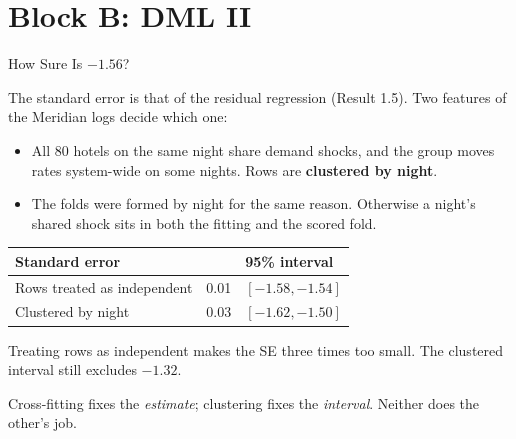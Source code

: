 \documentclass[aspectratio=169, 11pt, handout]{beamer}
\begin{document}
\section{Block B: DML II}

\begin{frame}{How Sure Is $-1.56$?}

The standard error is that of the residual regression (Result 1.5). Two features of the Meridian logs decide which one:
\begin{itemize}
  \item All 80 hotels on the same night share demand shocks, and the group moves rates system-wide on some nights. Rows are \textbf{clustered by night}.
  \item The folds were formed by night for the same reason. Otherwise a night's shared shock sits in both the fitting and the scored fold.
\end{itemize}

\begin{center}
\small
\begin{tabular}{lrl}
\toprule
\textbf{Standard error} & & \textbf{95\% interval} \\
\midrule
Rows treated as independent & 0.01 & $[-1.58, -1.54]$ \\
Clustered by night & 0.03 & $[-1.62, -1.50]$ \\
\bottomrule
\end{tabular}
\end{center}

\medskip

Treating rows as independent makes the SE three times too small. The clustered interval still excludes $-1.32$.

\medskip

Cross-fitting fixes the \emph{estimate}; clustering fixes the \emph{interval}. Neither does the other's job.
\end{frame}
\end{document}
